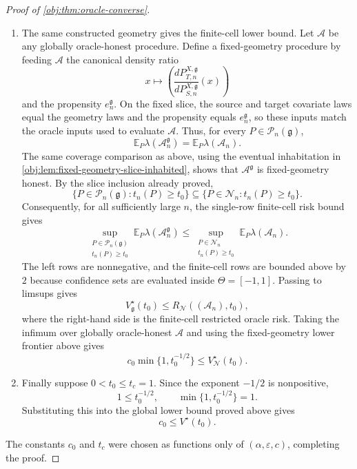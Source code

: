 \begin{proof}[Proof of \cref{obj:thm:oracle-converse}]
\begin{enumerate}
\item The same constructed geometry gives the finite-cell lower bound. Let \(\mathcal A\) be
any globally oracle-honest procedure. Define a fixed-geometry procedure by feeding
\(\mathcal A\) the canonical density ratio
\[
  x\mapsto
  \left(\frac{dP^{X,\mathfrak g}_{T,n}}{dP^{X,\mathfrak g}_{S,n}}(x)\right)
\]
and the propensity \(e^{\mathfrak g}_n\). On the fixed slice, the source and target covariate
laws equal the geometry laws and the propensity equals \(e^{\mathfrak g}_n\), so these inputs
match the oracle inputs used to evaluate \(\mathcal A\). Thus, for every
\(P\in\mathcal P_n(\mathfrak g)\),
\[
  \mathbb E_P\lambda(\mathcal A^{\mathfrak g}_n)
  =
  \mathbb E_P\lambda(\mathcal A_n).
\]
The same coverage comparison as above, using the eventual inhabitation in
\cref{obj:lem:fixed-geometry-slice-inhabited}, shows that \(\mathcal A^{\mathfrak g}\) is
fixed-geometry honest. By the slice inclusion already proved,
\[
  \{P\in\mathcal P_n(\mathfrak g):t_n(P)\ge t_0\}
  \subseteq
  \{P\in\mathcal N_n:t_n(P)\ge t_0\}.
\]
Consequently, for all sufficiently large \(n\), the single-row finite-cell risk bound gives
\[
  \sup_{\substack{P\in\mathcal P_n(\mathfrak g)\\ t_n(P)\ge t_0}}
  \mathbb E_P\lambda(\mathcal A^{\mathfrak g}_n)
  \le
  \sup_{\substack{P\in\mathcal N_n\\ t_n(P)\ge t_0}}
  \mathbb E_P\lambda(\mathcal A_n).
\]
The left rows are nonnegative, and the finite-cell rows are bounded above by \(2\) because
confidence sets are evaluated inside \(\Theta=[-1,1]\). Passing to limsups gives
\[
  V_{\mathfrak g}^\star(t_0)
  \le
  R_{\mathcal N}((\mathcal A_n),t_0),
\]
where the right-hand side is the finite-cell restricted oracle risk. Taking the infimum over
globally oracle-honest \(\mathcal A\) and using the fixed-geometry lower frontier above gives
\[
  c_0\min\{1,t_0^{-1/2}\}
  \le
  V_{\mathcal N}^\star(t_0).
\] %

\item Finally suppose \(0<t_0\le t_c=1\). Since the exponent \(-1/2\) is nonpositive,
\[
  1\le t_0^{-1/2},
  \qquad
  \min\{1,t_0^{-1/2}\}=1 .
\]
Substituting this into the global lower bound proved above gives
\[
  c_0\le V^\star(t_0).
\] %
\end{enumerate}
The constants \(c_0\) and \(t_c\) were chosen as functions only of
\((\alpha,\varepsilon,c)\), completing the proof. %
\end{proof}

